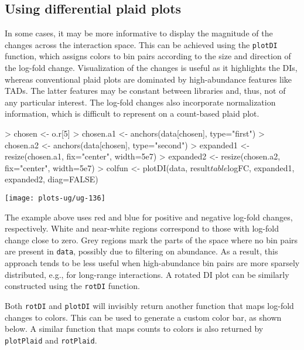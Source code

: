 \documentclass[12pt]{report}
\renewenvironment{Schunk}{\vspace{0pt}}{\vspace{0pt}}
\newcommand{\code}[1]{{\small\texttt{#1}}}
\begin{document}
\subsection{Using differential plaid plots}
In some cases, it may be more informative to display the magnitude of the changes across the interaction space.
This can be achieved using the \code{plotDI} function, which assigns colors to bin pairs according to the size and direction of the log-fold change.
Visualization of the changes is useful as it highlights the DIs, whereas conventional plaid plots are dominated by high-abundance features like TADs.
The latter features may be constant between libraries and, thus, not of any particular interest.
The log-fold changes also incorporate normalization information, which is difficult to represent on a count-based plaid plot.

\begin{Schunk}
\begin{Sinput}
> chosen <- o.r[5]
> chosen.a1 <- anchors(data[chosen], type="first")
> chosen.a2 <- anchors(data[chosen], type="second")
> expanded1 <- resize(chosen.a1, fix="center", width=5e7)
> expanded2 <- resize(chosen.a2, fix="center", width=5e7)
> colfun <- plotDI(data, result$table$logFC, expanded1, expanded2, diag=FALSE)
\end{Sinput}
\end{Schunk}

\begin{center}
\texttt{[image: plots-ug/ug-136]}
\end{center}


The example above uses red and blue for positive and negative log-fold changes, respectively.
White and near-white regions correspond to those with log-fold change close to zero.
Grey regions mark the parts of the space where no bin pairs are present in \code{data}, possibly due to filtering on abundance.
As a result, this approach tends to be less useful when high-abundance bin pairs are more sparsely distributed, e.g., for long-range interactions.
A rotated DI plot can be similarly constructed using the \code{rotDI} function.

Both \code{rotDI} and \code{plotDI} will invisibly return another function that maps log-fold changes to colors.
This can be used to generate a custom color bar, as shown below.
A similar function that maps counts to colors is also returned by \code{plotPlaid} and \code{rotPlaid}.
\end{document}
